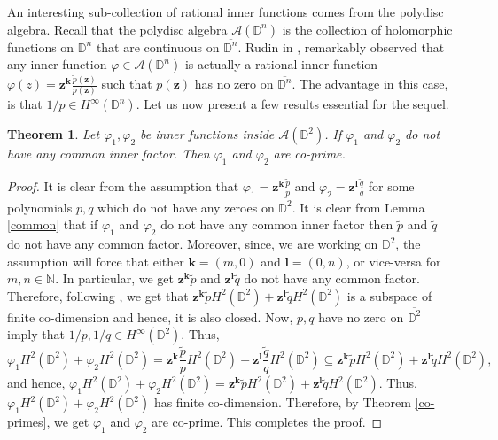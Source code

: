 \documentclass[12pt, a4 paper]{amsart}
\newcommand{\D}{\mathbb{D}}
\theoremstyle{definition}
\newtheorem*{quesn*}{Question}
\theoremstyle{plain}
\newtheorem{thm}{Theorem}[section]
\theoremstyle{definition}
\numberwithin{equation}{section}
\let\phi=\varphi
\begin{document}
An interesting sub-collection of rational inner functions comes from the polydisc algebra. Recall that the polydisc algebra $\mathcal{A}(\D^n)$ is the collection of holomorphic functions on $\D^n$ that are continuous on $\overline{\D^n}$. Rudin in \cite[Theorem 5.2.5]{Rudin}, remarkably observed that any inner function $\phi \in \mathcal{A}(\D^n)$ is actually a rational inner function $\phi(z) =  \bm{z}^{\bm{k}}\frac{\tilde{p}(\bm{z})}{p(\bm{z})}$ such that $p(\bm{z})$ has no zero on $\overline{\D^n}$. The advantage in this case, is that $1/p \in H^{\infty}(\D^n)$. Let us now present a few results essential for the sequel.
\begin{thm}\label{disc_case}
Let $\phi_1, \phi_2$ be inner functions inside $\mathcal{A}(\D^2)$. If $\phi_1$ and $\phi_2$ do not have any common inner factor. Then $\phi_1$ and $\phi_2$ are co-prime.
\end{thm}
\begin{proof}
It is clear from the assumption that $\phi_1=\bm{z}^{\bm{k}} \frac{\tilde{p}}{p}$ and $\phi_2 = \bm{z}^{\bm{l}}\frac{\tilde{q}}{q}$ for some polynomials $p,q$ which do not have any zeroes on $\overline{\D^2}$. It is clear from Lemma \ref{common} that if $\phi_1$ and $\phi_2$ do not have any common inner factor then $\tilde{p}$ and $\tilde{q}$ do not have any common factor. Moreover, since, we are working on $\D^2$, the assumption will force that either $\bm{k} = (m,0)$ and $\bm{l} = (0,n)$, or vice-versa for $m,n \in \mathbb{N}$. In particular, we get $\bm{z}^{\bm{k}} \tilde{p}$ and $\bm{z}^{\bm{l}} \tilde{q}$ do not have any common factor. Therefore, following \cite[ Lemma 3.7, Step 2]{GW}, we get that $\bm{z}^{\bm{k}}\tilde{p} H^2(\D^2) + \bm{z}^{\bm{l}}\tilde{q} H^2(\D^2)$ is a subspace of finite co-dimension and hence, it is also closed. Now, $p, q$ have no zero on $\overline{\D^2}$ imply that $1/p, 1/q \in H^{\infty}(\D^2)$. Thus,
\[
\phi_1 H^2(\D^2) + \phi_2 H^2(\D^2) =  \bm{z}^{\bm{k}}\frac{\tilde{p}}{p} H^2(\D^2) + \bm{z}^{\bm{l}}\frac{\tilde{q}}{q} H^2(\D^2) \subseteq \bm{z}^{\bm{k}}\tilde{p} H^2(\D^2) + \bm{z}^{\bm{l}}\tilde{q} H^2(\D^2),
\]
and hence, $\phi_1 H^2(\D^2) + \phi_2 H^2(\D^2) = \bm{z}^{\bm{k}}\tilde{p} H^2(\D^2) + \bm{z}^{\bm{l}}\tilde{q} H^2(\D^2)$. Thus, $\phi_1 H^2(\D^2) + \phi_2 H^2(\D^2)$ has finite co-dimension. Therefore, by Theorem \ref{co-primes}, we get $\phi_1$ and $\phi_2$ are co-prime. This completes the proof.
\end{proof}
\end{document}
